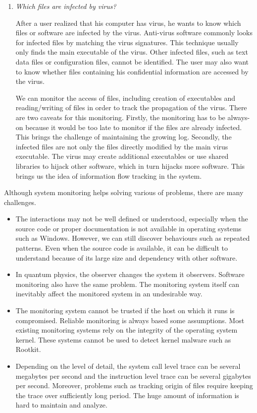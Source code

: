 \begin{enumerate}
\item {\em Which files are infected by virus?}

After a user realized that his computer has virus, he wants to know
which files or software are infected by the virus.
Anti-virus software commonly looks for infected files by matching the
virus signatures.
This technique usually only finds the main executable of the virus.
Other infected files, such as text data files or configuration files,
cannot be identified.
The user may also want to know whether files containing his confidential
information are accessed by the virus.

We can monitor the access of files, including creation of executables
and reading/writing of files in order to track the propagation of the virus.
There are two caveats for this monitoring.
Firstly, the monitoring has to be always-on because it would be
too late to monitor if the files are already infected.
This brings the challenge of maintaining the growing log.
Secondly, the infected files are not only the files directly modified by
the main virus executable.
The virus may create additional executables or use shared libraries to
hijack other software, which in turn hijacks more software.
This brings us the idea of information flow tracking in the system.
\end{enumerate}

Although system monitoring helps solving various of problems,
there are many challenges.

\begin{itemize}
\item
The interactions may not be well defined or understood,
especially when the source code or proper documentation is not available
in operating systems such as Windows.
However, we can still discover behaviours such as repeated patterns.
Even when the source code is available, it can be difficult to understand
because of its large size and dependency with other software.
\item
In quantum physics, the observer changes the system it observers.
Software monitoring also have the same problem.
The monitoring system itself can inevitably affect the monitored system
in an undesirable way.
\item
The monitoring system cannot be trusted if the host on which it
runs is compromised.
Reliable monitoring is always based some assumptions.
Most existing monitoring systems rely on the integrity of
the operating system kernel.
These systems cannot be used to detect kernel malware such as Rootkit.
\item
Depending on the level of detail, the system call level trace can be
several megabytes per second and the instruction level trace can be
several gigabytes per second.
Moreover, problems such as tracking origin of files require keeping the trace
over sufficiently long period.
The huge amount of information is hard to maintain and
analyze.
\end{itemize}

